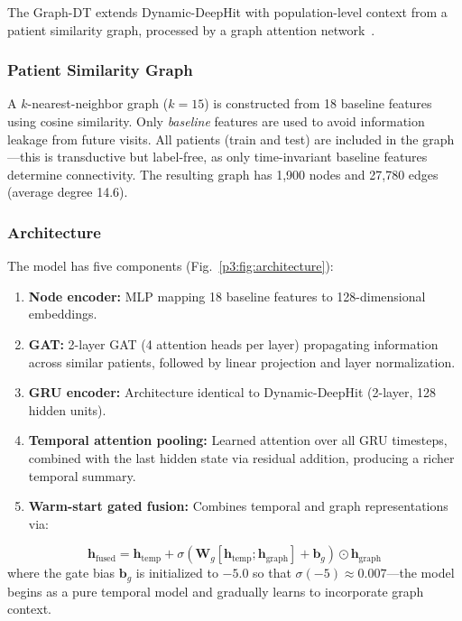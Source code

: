 The Graph-DT extends Dynamic-DeepHit with population-level context from a patient similarity graph, processed by a graph attention network~\cite{velickovic2018}.

\subsubsection{Patient Similarity Graph}

A $k$-nearest-neighbor graph ($k{=}15$) is constructed from 18 baseline features using cosine similarity. Only \textit{baseline} features are used to avoid information leakage from future visits. All patients (train and test) are included in the graph---this is transductive but label-free, as only time-invariant baseline features determine connectivity. The resulting graph has 1,900 nodes and 27,780 edges (average degree 14.6).

\subsubsection{Architecture}

The model has five components (Fig.~\ref{p3:fig:architecture}):
\begin{enumerate}
    \item \textbf{Node encoder:} MLP mapping 18 baseline features to 128-dimensional embeddings.
    \item \textbf{GAT:} 2-layer GAT (4 attention heads per layer) propagating information across similar patients, followed by linear projection and layer normalization.
    \item \textbf{GRU encoder:} Architecture identical to Dynamic-DeepHit (2-layer, 128 hidden units).
    \item \textbf{Temporal attention pooling:} Learned attention over all GRU timesteps, combined with the last hidden state via residual addition, producing a richer temporal summary.
    \item \textbf{Warm-start gated fusion:} Combines temporal and graph representations via:
\end{enumerate}
\begin{equation}
    \mathbf{h}_\text{fused} = \mathbf{h}_\text{temp} + \sigma\!\left(\mathbf{W}_g[\mathbf{h}_\text{temp}; \mathbf{h}_\text{graph}] + \mathbf{b}_g\right) \odot \mathbf{h}_\text{graph}
\end{equation}
where the gate bias $\mathbf{b}_g$ is initialized to $-5.0$ so that $\sigma(-5) \approx 0.007$---the model begins as a pure temporal model and gradually learns to incorporate graph context.

